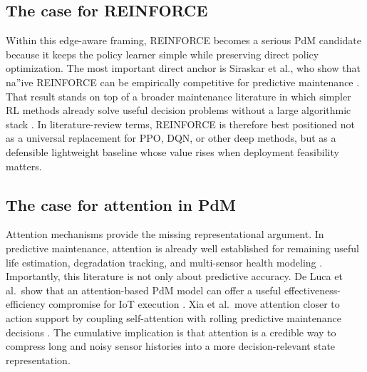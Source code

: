 \subsection{The case for REINFORCE}

Within this edge-aware framing, REINFORCE becomes a serious PdM candidate because it keeps the policy learner simple while preserving direct policy optimization. The most important direct anchor is Siraskar et al., who show that na”ive REINFORCE can be empirically competitive for predictive maintenance \cite{Sir25}. That result stands on top of a broader maintenance literature in which simpler RL methods already solve useful decision problems without a large algorithmic stack \cite{Wan14,Ads20,You20}. In literature-review terms, REINFORCE is therefore best positioned not as a universal replacement for PPO, DQN, or other deep methods, but as a defensible lightweight baseline whose value rises when deployment feasibility matters.

\subsection{The case for attention in PdM}

Attention mechanisms provide the missing representational argument. In predictive maintenance, attention is already well established for remaining useful life estimation, degradation tracking, and multi-sensor health modeling \cite{Che20b,Che21e,Cha22,Luc23}. Importantly, this literature is not only about predictive accuracy. De Luca et al. show that an attention-based PdM model can offer a useful effectiveness-efficiency compromise for IoT execution \cite{Luc23}. Xia et al. move attention closer to action support by coupling self-attention with rolling predictive maintenance decisions \cite{Xia22}. The cumulative implication is that attention is a credible way to compress long and noisy sensor histories into a more decision-relevant state representation.

